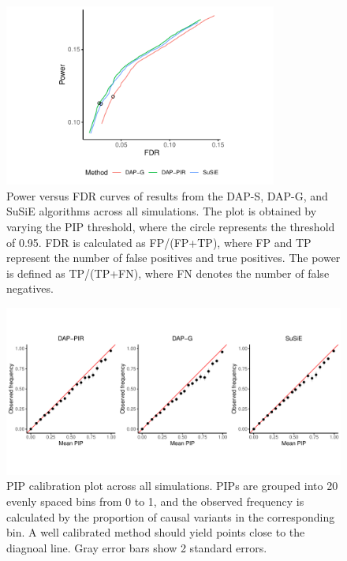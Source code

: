 \documentclass[pdflatex,sn-mathphys-num]{sn-jnl}%
\theoremstyle{thmstyleone}%
\theoremstyle{thmstyletwo}%
\theoremstyle{thmstylethree}%
\begin{document}
\begin{figure}[H]
    \centering
    \includegraphics[width=0.8\textwidth]{files/plot_power.pdf}
    \caption{Power versus FDR curves of results from the DAP-S, DAP-G, and SuSiE algorithms across all simulations. The plot is obtained by varying the PIP threshold, where the circle represents the threshold of 0.95. FDR is calculated as FP/(FP+TP), where FP and TP represent the number of false positives and true positives. The power is defined as TP/(TP+FN), where FN denotes the number of false negatives.}
    \label{fig:power}
\end{figure}

\begin{figure}[H]
    \centering
    \includegraphics[width=1\textwidth]{files/plot_cali_gtex.pdf}
    \vspace{-1cm}
    \caption{PIP calibration plot across all simulations. PIPs are grouped into 20 evenly spaced bins from 0 to 1, and the observed frequency is calculated by the proportion of causal variants in the corresponding bin. A well calibrated method should yield points close to the diagnoal line. Gray error bars show 2 standard errors.}
    \label{fig:calibration}
\end{figure}
\end{document}
